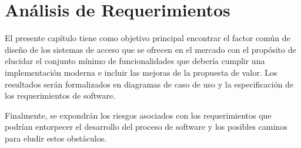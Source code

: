 
\chapter{Análisis de Requerimientos} %


El presente capítulo tiene como objetivo principal encontrar el factor común de diseño
de los sistemas de acceso que se ofrecen en el mercado con el propósito de elucidar el conjunto mínimo de funcionalidades que debería cumplir una implementación moderna e incluir 
las mejoras de la propuesta de valor. Los resultados serán formalizados en diagramas de caso de uso y la especificación de los requerimientos de software.

Finalmente, se expondrán los riesgos asociados con los requerimientos que podrían entorpecer el desarrollo del proceso de software y los posibles caminos para eludir estos obstáculos.
\\

\label{Chapter3} %


